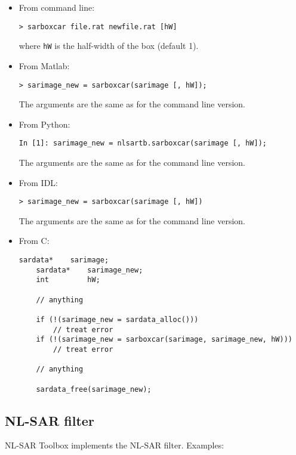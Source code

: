 \documentclass[10pt,french,english,a4paper]{article}
\begin{document}
\begin{itemize}
\item From command line:
  \begin{Verbatim}[frame=single]
    > sarboxcar file.rat newfile.rat [hW]
  \end{Verbatim}
  where \texttt{hW} is the half-width of the box (default 1).
\item From Matlab:
  \begin{Verbatim}[frame=single]
    > sarimage_new = sarboxcar(sarimage [, hW]);
  \end{Verbatim}
  The arguments are the same as for the command line version.
\item From Python:
  \begin{Verbatim}[frame=single]
    In [1]: sarimage_new = nlsartb.sarboxcar(sarimage [, hW]);

  \end{Verbatim}
  The arguments are the same as for the command line version.
\item From IDL:
  \begin{Verbatim}[frame=single]
    > sarimage_new = sarboxcar(sarimage [, hW])
  \end{Verbatim}
  The arguments are the same as for the command line version.
\item From C:
  \begin{Verbatim}[frame=single]
    sardata*    sarimage;
    sardata*    sarimage_new;
    int         hW;

    // anything

    if (!(sarimage_new = sardata_alloc()))
        // treat error
    if (!(sarimage_new = sarboxcar(sarimage, sarimage_new, hW)))
        // treat error

    // anything

    sardata_free(sarimage_new);
  \end{Verbatim}
\end{itemize}

\subsection{NL-SAR filter}

NL-SAR Toolbox implements the NL-SAR filter. Examples:
\end{document}
